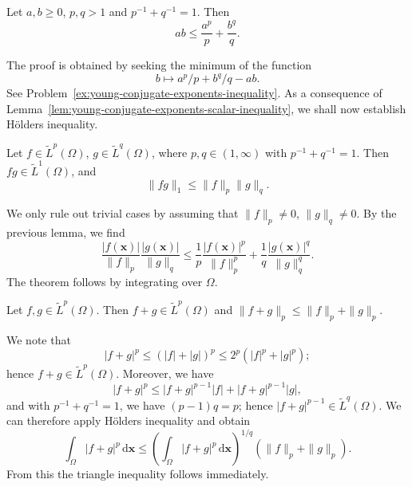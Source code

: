 \begin{Lemma}
\label{lem:young-conjugate-exponents-scalar-inequality}
Let $a,b\geq0$, $p,q>1$ and $p^{-1}+q^{-1}=1$. Then
\begin{equation}\label{eq:young-conjugate-exponents-scalar-inequality}
ab\leq\dfrac{a^p}p+\dfrac{b^q}q.
\end{equation}

\end{Lemma}

The proof is obtained by seeking the minimum of the function \[b\mapsto a^p/p+b^q/q-ab.\] See Problem~\ref{ex:young-conjugate-exponents-inequality}. As a consequence of Lemma~\ref{lem:young-conjugate-exponents-scalar-inequality}, we shall now establish Hölder\textquotesingle s inequality.

\begin{Theorem}
\label{thm:continuous-functions-holder-inequality}
Let $f\in\widetilde L^p(\Omega)$, $g\in\widetilde L^q(\Omega)$, where $p,q\in(1,\infty)$ with $p^{-1}+q^{-1}=1$. Then $fg\in\widetilde L^1(\Omega)$, and
\begin{equation}\label{eq:continuous-functions-holder-inequality}
\|fg\|_1\leq\|f\|_p\|g\|_q.
\end{equation}

\end{Theorem}

\begin{Proof}
We only rule out trivial cases by assuming that $\|f\|_p\ne0$, $\|g\|_q\ne0$. By the previous lemma, we find
\begin{equation}\label{eq:holder-normalized-young-pointwise-bound}
\dfrac{|f(\bm{x})|}{\|f\|_p}\dfrac{|g(\bm{x})|}{\|g\|_q}\leq\dfrac1p\dfrac{|f(\bm{x})|^p}{\|f\|_p^p}+\dfrac1q\dfrac{|g(\bm{x})|^q}{\|g\|_q^q}.
\end{equation}
The theorem follows by integrating over $\Omega$.
\end{Proof}

\begin{Theorem}
\label{thm:continuous-functions-lp-triangle-inequality}
Let $f,g\in\widetilde L^p(\Omega)$. Then $f+g\in\widetilde L^p(\Omega)$ and $\|f+g\|_p\leq\|f\|_p+\|g\|_p$.
\end{Theorem}

\begin{Proof}
We note that
\begin{equation}\label{eq:lp-sum-integrability-bound}
|f+g|^p\leq(|f|+|g|)^p\leq2^p(|f|^p+|g|^p);
\end{equation}
hence $f+g\in\widetilde L^p(\Omega)$. Moreover, we have
\begin{equation}\label{eq:lp-triangle-pointwise-product-bound}
|f+g|^p\leq|f+g|^{p-1}|f|+|f+g|^{p-1}|g|,
\end{equation}
and with $p^{-1}+q^{-1}=1$, we have $(p-1)q=p$; hence $|f+g|^{p-1}\in\widetilde L^q(\Omega)$. We can therefore apply Hölder\textquotesingle s inequality and obtain
\begin{equation}\label{eq:lp-triangle-holder-integral-bound}
\int_\Omega|f+g|^p\,\mathrm{d}\bm{x}\leq\left(\int_\Omega|f+g|^p\,\mathrm{d}\bm{x}\right)^{1/q}(\|f\|_p+\|g\|_p).
\end{equation}
From this the triangle inequality follows immediately.
\end{Proof}
